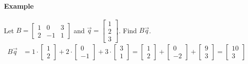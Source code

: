 \paragraph*{Example} Let $B = \begin{bmatrix}
    1 & 0 & 3 \\
    2 & -1 & 1
\end{bmatrix}$ and $\vec{q} = \begin{bmatrix} 1 \\ 2 \\ 3 \end{bmatrix}$. Find $B\vec{q}$.
\begin{align*}
B\vec{q} &= 1 \cdot \begin{bmatrix} 1 \\ 2 \end{bmatrix} + 2 \cdot \begin{bmatrix} 0 \\ -1 \end{bmatrix} + 3 \cdot \begin{bmatrix} 3 \\ 1 \end{bmatrix} = \begin{bmatrix} 1 \\ 2 \end{bmatrix} + \begin{bmatrix} 0 \\ -2 \end{bmatrix} + \begin{bmatrix} 9 \\ 3 \end{bmatrix} = \begin{bmatrix} 10 \\ 3 \end{bmatrix}
\end{align*}


